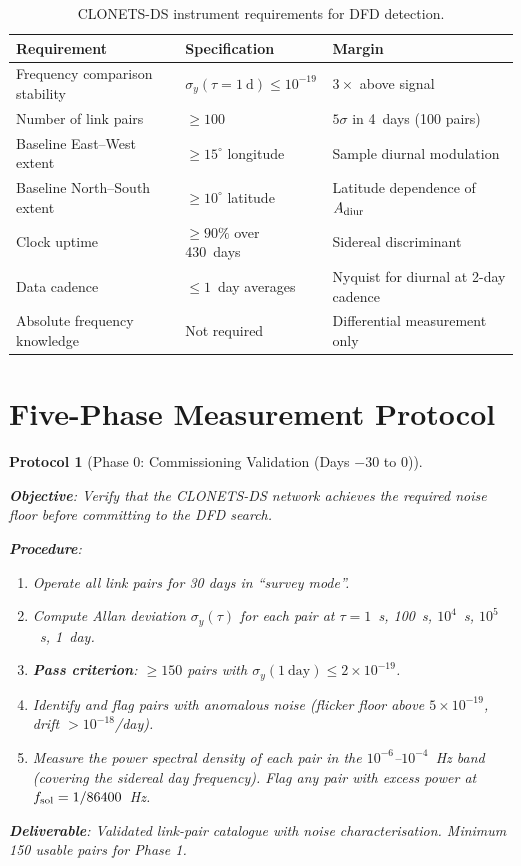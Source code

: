 \documentclass[11pt]{article}
\newtheorem{protocol}{Protocol}
\newcommand{\ee}[1]{\times 10^{#1}}
\begin{document}
\begin{table}[H]
\centering
\caption{CLONETS-DS instrument requirements for DFD detection.}
\begin{tabular}{lll}
\toprule
\textbf{Requirement} & \textbf{Specification} & \textbf{Margin} \\
\midrule
Frequency comparison stability & $\sigma_y(\tau = 1~\text{d}) \leq 10^{-19}$ &
  $3\times$ above signal \\
Number of link pairs & $\geq 100$ & $5\sigma$ in 4~days (100 pairs) \\
Baseline East--West extent & $\geq 15^\circ$ longitude & Sample diurnal modulation \\
Baseline North--South extent & $\geq 10^\circ$ latitude & Latitude dependence of $A_{\rm diur}$ \\
Clock uptime & $\geq 90\%$ over 430~days & Sidereal discriminant \\
Data cadence & $\leq 1$~day averages & Nyquist for diurnal at 2-day cadence \\
Absolute frequency knowledge & Not required & Differential measurement only \\
\bottomrule
\end{tabular}
\end{table}

\section{Five-Phase Measurement Protocol}
\label{sec:protocol}

\begin{protocol}[Phase 0: Commissioning Validation (Days $-30$ to 0)]
\label{prot:phase0}
\mbox{}

\textbf{Objective}: Verify that the CLONETS-DS network achieves the
required noise floor before committing to the DFD search.

\textbf{Procedure}:
\begin{enumerate}[nosep]
\item Operate all link pairs for 30 days in ``survey mode''.
\item Compute Allan deviation $\sigma_y(\tau)$ for each pair at
  $\tau = 1$~s, 100~s, $10^4$~s, $10^5$~s, 1~day.
\item \textbf{Pass criterion}: $\geq 150$ pairs with
  $\sigma_y(1~\text{day}) \leq 2\ee{-19}$.
\item Identify and flag pairs with anomalous noise (flicker floor
  above $5\ee{-19}$, drift $> 10^{-18}$/day).
\item Measure the power spectral density of each pair in the
  $10^{-6}$--$10^{-4}$~Hz band (covering the sidereal day frequency).
  Flag any pair with excess power at $f_{\rm sol} = 1/86400$~Hz.
\end{enumerate}

\textbf{Deliverable}: Validated link-pair catalogue with noise
characterisation. Minimum 150 usable pairs for Phase 1.
\end{protocol}
\end{document}
